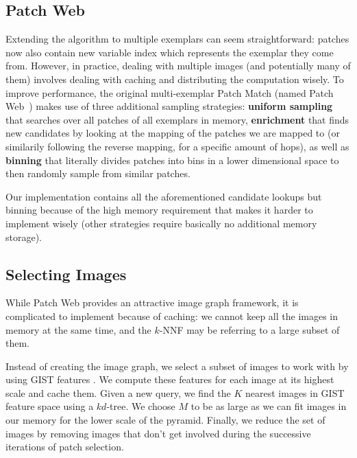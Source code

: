 
\subsection{Patch Web}
Extending the algorithm to multiple exemplars can seem straightforward: patches now also contain new variable index which represents the exemplar they come from.
However, in practice, dealing with multiple images (and potentially many of them) involves dealing with caching and distributing the computation wisely.
To improve performance, the original multi-exemplar Patch Match (named Patch Web~\cite{Barnes11}) makes use of three additional sampling strategies:
\textbf{uniform sampling} that searches over all patches of all exemplars in memory,
\textbf{enrichment} that finds new candidates by looking at the mapping of the patches we are mapped to (or similarily following the reverse mapping, for a specific amount of hops), as well as
\textbf{binning} that literally divides patches into bins in a lower dimensional space to then randomly sample from similar patches.

Our implementation contains all the aforementioned candidate lookups but binning because of the high memory requirement that makes it harder to implement wisely (other strategies require basically no additional memory storage).

\subsection{Selecting Images}
While Patch Web provides an attractive image graph framework, it is complicated to implement because of caching: we cannot keep all the images in memory at the same time, and the $k$-NNF may be referring to a large subset of them.

Instead of creating the image graph, we select a subset of images to work with by using GIST features \cite{Torralba08b}.
We compute these features for each image at its highest scale and cache them.
Given a new query, we find the $K$ nearest images in GIST feature space using a $kd$-tree.
We choose $M$ to be as large as we can fit images in our memory for the lower scale of the pyramid.
Finally, we reduce the set of images by removing images that don't get involved during the successive iterations of patch selection.